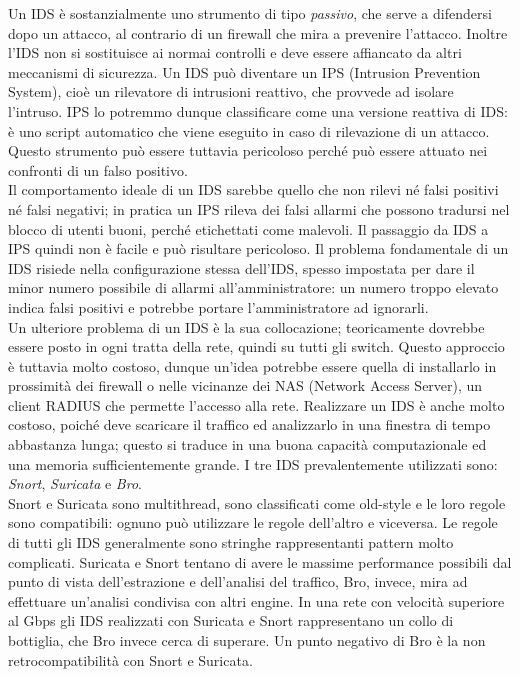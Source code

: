 Un IDS è sostanzialmente uno strumento di tipo \textit{passivo}, che serve a difendersi dopo un attacco, al contrario di un firewall che mira a prevenire l'attacco. Inoltre l'IDS non si sostituisce ai normai controlli e deve essere affiancato da altri meccanismi di sicurezza. Un IDS può diventare un IPS (Intrusion Prevention System), cioè un rilevatore di intrusioni reattivo, che provvede ad isolare l'intruso. IPS lo potremmo dunque classificare come una versione reattiva di IDS: è uno script automatico che viene eseguito in caso di rilevazione di un attacco. Questo strumento può essere tuttavia pericoloso perché può essere attuato nei confronti di un falso positivo.\\
Il comportamento ideale di un IDS sarebbe quello che non rilevi né falsi positivi né falsi negativi; in pratica un IPS rileva dei falsi allarmi che possono tradursi nel blocco di utenti buoni, perché etichettati come malevoli. Il passaggio da IDS a IPS quindi non è facile e può risultare pericoloso. Il problema fondamentale di un IDS risiede nella configurazione stessa dell'IDS, spesso impostata per dare il minor numero possibile di allarmi all'amministratore: un numero troppo elevato indica falsi positivi e potrebbe portare l'amministratore ad ignorarli.\\
Un ulteriore problema di un IDS è la sua collocazione; teoricamente dovrebbe essere posto in ogni tratta della rete, quindi su tutti gli switch. Questo approccio è tuttavia molto costoso, dunque un'idea potrebbe essere quella di installarlo in prossimità dei firewall o nelle vicinanze dei NAS (Network Access Server), un client RADIUS che permette l'accesso alla rete. Realizzare un IDS è anche molto costoso, poiché deve scaricare il traffico ed analizzarlo in una finestra di tempo abbastanza lunga; questo si traduce in una buona capacità computazionale ed una memoria sufficientemente grande. I tre IDS prevalentemente utilizzati sono: \textit{Snort}, \textit{Suricata} e \textit{Bro}.\\
Snort e Suricata sono multithread, sono classificati come old-style e le loro regole sono compatibili: ognuno può utilizzare le regole dell'altro e viceversa. Le regole di tutti gli IDS generalmente sono stringhe rappresentanti pattern molto complicati. Suricata e Snort tentano di avere le massime performance possibili dal punto di vista dell'estrazione e dell'analisi del traffico, Bro, invece, mira ad effettuare un'analisi condivisa con altri engine. In una rete con velocità superiore al Gbps gli IDS realizzati con Suricata e Snort rappresentano un collo di bottiglia, che Bro invece cerca di superare. Un punto negativo di Bro è la non retrocompatibilità con Snort e Suricata.\\
